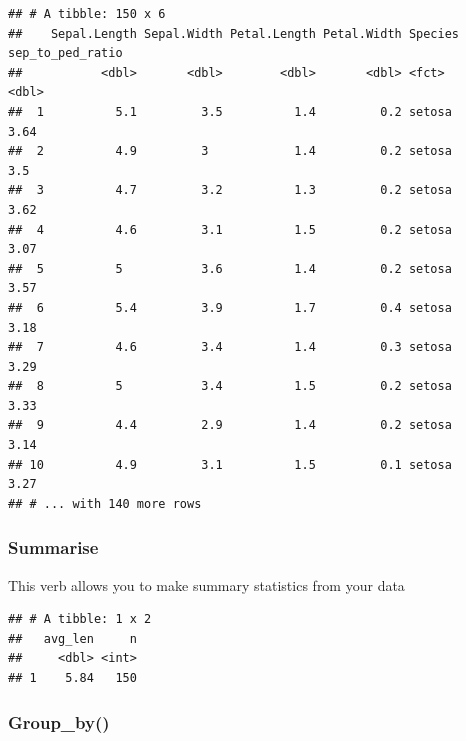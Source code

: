 \documentclass[
]{article}
\newenvironment{Shaded}{\begin{snugshade}}{\end{snugshade}}
\newcommand{\CommentTok}[1]{\textcolor[rgb]{0.56,0.35,0.01}{\textit{#1}}}
\newcommand{\DataTypeTok}[1]{\textcolor[rgb]{0.13,0.29,0.53}{#1}}
\newcommand{\KeywordTok}[1]{\textcolor[rgb]{0.13,0.29,0.53}{\textbf{#1}}}
\newcommand{\NormalTok}[1]{#1}
\newcommand{\OperatorTok}[1]{\textcolor[rgb]{0.81,0.36,0.00}{\textbf{#1}}}
\newcommand{\StringTok}[1]{\textcolor[rgb]{0.31,0.60,0.02}{#1}}
\begin{document}
\begin{verbatim}
## # A tibble: 150 x 6
##    Sepal.Length Sepal.Width Petal.Length Petal.Width Species sep_to_ped_ratio
##           <dbl>       <dbl>        <dbl>       <dbl> <fct>              <dbl>
##  1          5.1         3.5          1.4         0.2 setosa              3.64
##  2          4.9         3            1.4         0.2 setosa              3.5 
##  3          4.7         3.2          1.3         0.2 setosa              3.62
##  4          4.6         3.1          1.5         0.2 setosa              3.07
##  5          5           3.6          1.4         0.2 setosa              3.57
##  6          5.4         3.9          1.7         0.4 setosa              3.18
##  7          4.6         3.4          1.4         0.3 setosa              3.29
##  8          5           3.4          1.5         0.2 setosa              3.33
##  9          4.4         2.9          1.4         0.2 setosa              3.14
## 10          4.9         3.1          1.5         0.1 setosa              3.27
## # ... with 140 more rows
\end{verbatim}

\hypertarget{summarise}{%
\subsubsection{Summarise}\label{summarise}}

This verb allows you to make summary statistics from your data

\begin{Shaded}
\end{Shaded}

\begin{verbatim}
## # A tibble: 1 x 2
##   avg_len     n
##     <dbl> <int>
## 1    5.84   150
\end{verbatim}

\hypertarget{group_by}{%
\subsubsection{Group\_by()}\label{group_by}}
\end{document}
